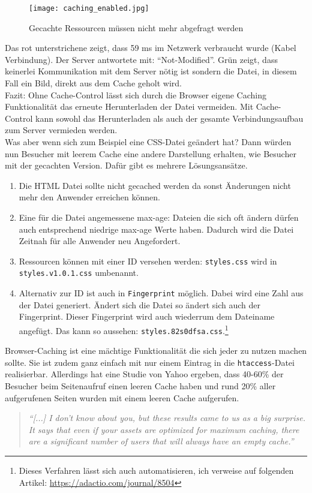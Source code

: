 			  \begin{figure}[htbp]
			  	\begin{center}
			  		\texttt{[image: caching\_enabled.jpg]}
			  		\caption{Gecachte Ressourcen müssen nicht mehr abgefragt werden}
			  		\label{fig:caching_enabled}
			  	\end{center}
			  \end{figure}
			  
			  Das rot unterstrichene zeigt, dass 59 ms im Netzwerk verbraucht wurde (Kabel Verbindung). Der Server antwortete mit: "`Not-Modified"'. Grün zeigt, dass keinerlei Kommunikation mit dem Server nötig ist sondern die Datei, in diesem Fall ein Bild, direkt aus dem Cache geholt wird.\\
			  Fazit: Ohne Cache-Control lässt sich durch die Browser eigene Caching Funktionalität das erneute Herunterladen der Datei vermeiden. Mit Cache-Control kann sowohl das Herunterladen als auch der gesamte Verbindungsaufbau zum Server vermieden werden.\\
			 
			  Was aber wenn sich zum Beispiel eine CSS-Datei geändert hat? Dann würden nun Besucher mit leerem Cache eine andere Darstellung erhalten, wie Besucher mit der gecachten Version. Dafür gibt es mehrere Lösungsansätze.

			  \begin{enumerate}
			  	\item Die HTML Datei sollte nicht gecached werden da sonst Änderungen nicht mehr den Anwender erreichen können.
			  	\item Eine für die Datei angemessene max-age: Dateien die sich oft ändern dürfen auch entsprechend niedrige max-age Werte haben. Dadurch wird die Datei Zeitnah für alle Anwender neu Angefordert.
			  	\item Ressourcen können mit einer ID versehen werden: \texttt{styles.css} wird in \texttt{styles.v1.0.1.css} umbenannt.
			  	\item Alternativ zur ID ist auch in \texttt{Fingerprint} möglich. Dabei wird eine Zahl aus der Datei generiert. Ändert sich die Datei so ändert sich auch der Fingerprint. Dieser Fingerprint wird auch wiederrum dem Dateiname angefügt. Das kann so aussehen: \texttt{styles.82s0dfsa.css}.\footnote{Dieses Verfahren lässt sich auch automatisieren, ich verweise auf folgenden Artikel: \url{https://adactio.com/journal/8504}}
			  \end{enumerate}

			  Browser-Caching ist eine mächtige Funktionalität die sich jeder zu nutzen machen sollte. Sie ist zudem ganz einfach mit nur einem Eintrag in die \texttt{htaccess}-Datei realisierbar. Allerdings hat eine Studie von Yahoo ergeben, dass 40-60\% der Besucher beim Seitenaufruf einen leeren Cache haben und rund 20\% aller aufgerufenen Seiten wurden mit einem leeren Cache aufgerufen.
				\begin{quote}
					\textit{"`[...] I don't know about you, but these results came to us as a big surprise. It says that even if your assets are optimized for maximum caching, there are a significant number of users that will always have an empty cache."'\autocite{yahoo07}}
				\end{quote}

